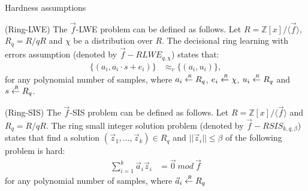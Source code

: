 \begin{section}{Hardness assumptions}

  \begin{definition}{(Ring-LWE)}
    The $\vec{f}$-LWE problem can be defined as follows.
    Let $R = \mathbb{Z}[x] /\langle \vec{f}\rangle$, $R_q = R/ qR$ and $\chi$ be a distribution over $R$.
    The decisional ring learning with errors assumption (denoted by $\vec{f}-RLWE_{q, \chi}$) states that:
    \begin{align*}
      \{ (a_i, a_i \cdot s + e_i)\} &\approx_c \{(a_i, u_i)\},
    \end{align*}
    for any polynomial number of samples, where $a_i \stackrel{{\scriptscriptstyle \mkern4mu R}}{\gets} R_q$, $e_i \stackrel{{\scriptscriptstyle \mkern4mu R}}{\gets} \chi$, $u_i \stackrel{{\scriptscriptstyle \mkern4mu R}}{\gets} R_q$ and $s \stackrel{{\scriptscriptstyle \mkern4mu R}}{\gets} R_q$.
  \end{definition}

  \begin{definition}{(Ring-SIS)}
    The $\vec{f}$-SIS problem can be defined as follows.
    Let $R = \mathbb{Z}[x] /\langle \vec{f}\rangle$ and $R_q = R/ qR$.
    The ring small integer solution problem (denoted by $\vec{f}-RSIS_{k, q, \beta}$) states that find a solution $(\vec{z}_1, \dots, \vec{z}_k) \in R_q$ and $||\vec{z}_i|| \leq \beta$ of the following problem is hard:
    \begin{align*}
      \sum_{i= 1}^k \vec{a}_i \vec{z}_i &= \vec{0}~mod~\vec{f}
    \end{align*}
    for any polynomial number of samples, where $\vec{a}_i \stackrel{{\scriptscriptstyle \mkern4mu R}}{\gets} R_q$
  \end{definition}

\end{section}